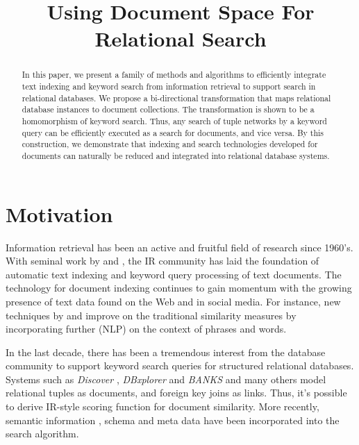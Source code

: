 \documentclass[conference]{IEEEtran}
\begin{document}
\title{Using Document Space For Relational Search}
\author{
    \and
}
\maketitle

\begin{abstract}
In this paper, we present a family of methods and algorithms to efficiently integrate text indexing and keyword search from information retrieval to support search in relational databases.  We propose a bi-directional transformation that maps relational database instances to document collections.  The transformation is shown to be a homomorphism of keyword search.  Thus, any search of tuple networks by a keyword query can be efficiently executed as a search for documents, and vice versa.  By this construction, we demonstrate that indexing and search technologies developed for documents can naturally be reduced and integrated into relational database systems.
\end{abstract}

\section{Motivation}

Information retrieval has been an active and fruitful field of research since 1960's.  With
seminal work by \cite{jones72} and \cite{salton75}, the
IR community has laid the foundation of automatic text indexing and
keyword query processing of text documents.  The technology for document
indexing continues to gain momentum with the growing presence of text data found
on the Web and in social media.  For instance, new techniques by
\cite{janu12} and \cite{goyal13} improve on the traditional
similarity measures by incorporating further (NLP) on the context of phrases and words.

In the last decade, there has been a tremendous interest from the database community to support keyword search queries for structured relational databases.  Systems such as {\em Discover} \cite{hris02}, {\em DBxplorer} \cite{agrawal2002dbxplorer} and {\em BANKS} \cite{bhalotia2002keyword} and many others \cite{hristidis2003efficient,liu2006effective} model relational tuples as documents, and foreign key joins as links.  Thus, it's possible to derive IR-style scoring function for document similarity.  More recently, semantic information \cite{zeng2013semantic}, schema and meta data \cite{bergamaschi2011keyword} have been incorporated into the search algorithm.
\end{document}
